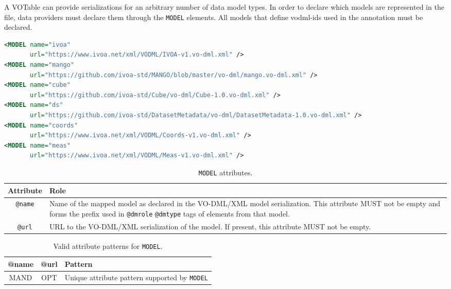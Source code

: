A VOTable can provide serializations for an arbitrary number of data model
types. In order to declare which models are represented in the file, data
providers must declare them through the \texttt{MODEL} elements.
All models that define vodml-ids used in the annotation must be declared.

\begin{lstlisting}[caption={Example \texttt{MODEL} mapping block. (see in context line \ref{MODEL_snippet}) },language=XML]
<MODEL name="ivoa"   
       url="https://www.ivoa.net/xml/VODML/IVOA-v1.vo-dml.xml" />
<MODEL name="mango"
       url="https://github.com/ivoa-std/MANGO/blob/master/vo-dml/mango.vo-dml.xml" />
<MODEL name="cube"
       url="https://github.com/ivoa-std/Cube/vo-dml/Cube-1.0.vo-dml.xml" />
<MODEL name="ds"
       url="https://github.com/ivoa-std/DatasetMetadata/vo-dml/DatasetMetadata-1.0.vo-dml.xml" />
<MODEL name="coords" 
       url="https://www.ivoa.net/xml/VODML/Coords-v1.vo-dml.xml" />
<MODEL name="meas"   
       url="https://www.ivoa.net/xml/VODML/Meas-v1.vo-dml.xml" />
\end{lstlisting}

\begin{table}[!htbp]
  \small
  \centering
  \begin{tabulary}{\linewidth}{|c|J|}       
    \hline 
         \textbf{Attribute} & 
         \textbf {Role}\\
    \hline
    \hline  
         \texttt{@name}  & 
         Name of the mapped model as declared in the VO-DML/XML model serialization.  This attribute MUST not be empty and forms the prefix used in  \texttt{@dmrole}  \texttt{@dmtype} tags of elements from that model.  \\
    \hline 
         \texttt{@url} & 
         URL to the VO-DML/XML serialization of the model. If present, this attribute MUST not be empty.\\
    \hline 
  \end{tabulary}
  \caption{\texttt{MODEL} attributes.} 
  \label{tbl:model-att}
\end{table}


\begin{table}[!htbp]
  \small
  \centering
  \begin{tabulary}{\linewidth}{|c |c |J|}
    \hline 
        \textbf{@name} &
        \textbf{@url} &
        \textbf{Pattern}\\
    \hline      \hline  
        MAND &           
        OPT &           
        Unique attribute pattern supported by \texttt{MODEL}\\
    \hline 
  \end{tabulary}
  \caption{Valid attribute patterns for  \texttt{MODEL}.} 
  \label{tbl:model-pattern}
\end{table}
